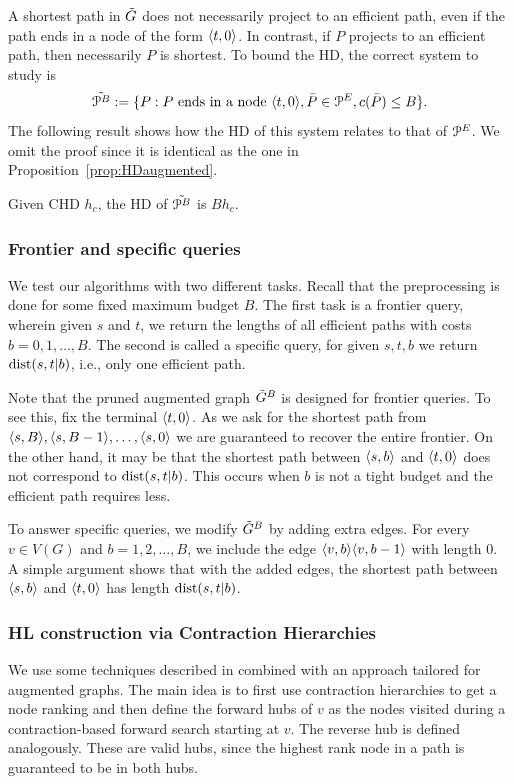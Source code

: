 A shortest path in $\tilde G$ does not necessarily project to an efficient path, even if the path ends in a node of the form $\langle t,0\rangle$.
In contrast, if $P$ projects to an efficient path, then necessarily $P$ is shortest. 
To bound the HD, the correct system to study is
\[
\tilde{\mathcal{P}^B}:=\{P: P\text{ ends in a node }\langle t,0\rangle, \bar P\in \mathcal{P}^E, c(\bar P)\leq B \}.
\]
The following result shows how the HD of this system relates to that of $\mathcal{P}^E$.
We omit the proof since it is identical as the one in Proposition~\ref{prop:HDaugmented}.
\begin{proposition}
Given CHD $h_c$, the HD of $\tilde{\mathcal{P}^B}$ is $Bh_c$.
\end{proposition}

\subsubsection{Frontier and specific queries}

We test our algorithms with two different tasks.
Recall that the preprocessing is done for some fixed maximum budget $B$.
The first task is a frontier query, wherein given $s$ and $t$, we return the lengths of all efficient paths with costs $b=0,1,\ldots,B$.
The second is called a specific query, for given $s,t,b$ we return $\mbox{dist}(s,t|b)$, i.e., only one efficient path.

Note that the pruned augmented graph $\tilde G^B$ is designed for frontier queries.
To see this, fix the terminal $\langle t,0\rangle$.
As we ask for the shortest path from $\langle s,B\rangle,\langle s,B-1\rangle,\ldots,\langle s,0\rangle$ we are guaranteed to recover the entire frontier.
On the other hand, it may be that the shortest path between $\langle s,b\rangle$ and $\langle t,0\rangle$ does not correspond to $\mbox{dist}(s,t|b)$.
This occurs when $b$ is not a tight budget and the efficient path requires less.

To answer specific queries, we modify $\tilde G^B$ by adding extra edges.
For every $v\in V(G)$ and $b=1,2,\ldots,B$, we include the edge $\langle v,b\rangle\langle v,b-1\rangle$ with length $0$.
A simple argument shows that with the added edges, the shortest path between $\langle s,b\rangle$ and $\langle t,0\rangle$ has length $\mbox{dist}(s,t|b)$.

\subsubsection{HL construction via Contraction Hierarchies}

We use some techniques described in \cite{hubimplem} combined with an approach tailored for augmented graphs.
The main idea is to first use contraction hierarchies to get a node ranking and then define the forward hubs of $v$ as the nodes visited during a contraction-based forward search starting at $v$.
The reverse hub is defined analogously.
These are valid hubs, since the highest rank node in a path is guaranteed to be in both hubs.

